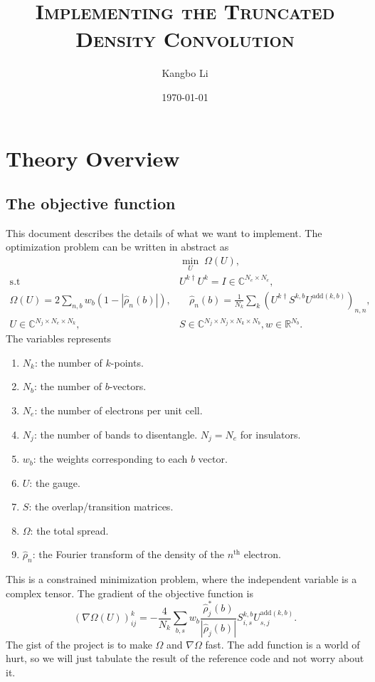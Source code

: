 \documentclass[a4paper, 12pt]{article}
\title{\scshape Implementing the Truncated Density Convolution}
\author{\normalsize Kangbo Li}
\date{\normalsize \today}
\begin{document}
\maketitle

\section{Theory Overview}%
\label{sec:Theory Overview}

\subsection{The objective function}%
\label{sub:The objective function}

This document describes the details of what we want to implement. 
The optimization problem can be written in abstract as 
\begin{align}
        &\min_{U}\;   \Omega(U),\\
        \mathrm{s.t}\; & U^{k \dagger} U^{k} = I \in \mathbb{C}^{N_e \times N_e},\\
        \Omega(U) = 2 \sum_{n, b} w_b (1 - |\hat{\rho}_n(b)|),& \quad \hat{\rho}_n(b) = \frac{1}{N_k}  \sum_k (U^{k \dagger} S^{k, b} U^{\mathrm{add}(k, b)})_{n,n},\\
        U \in \mathbb{C}^{N_j \times N_e \times N_k },& S \in \mathbb{C}^{N_j \times N_j \times N_k \times N_b }, 
        w \in \mathbb{R}^{N_b}\label{eq:dimensions}.
\end{align}
The variables represents 
\begin{enumerate}
    \item $N_k$: the number of $k$-points.
    \item $N_b$: the number of $b$-vectors. 
    \item $N_e$: the number of electrons per unit cell.
    \item $N_j$: the number of bands to disentangle. $N_j = N_e$ for insulators.
    \item $w_b$: the weights corresponding to each $b$ vector.
    \item $U$: the gauge.
    \item $S$: the overlap/transition matrices.
    \item $\Omega$: the total spread.
    \item $\hat{\rho}_n$: the Fourier transform of the density of the $n^{\mathrm{th}}$ electron.
\end{enumerate}

This is a constrained minimization problem, where the independent variable  is
a complex tensor. The gradient of the objective function is 
\begin{equation}
    (\nabla \Omega(U))^k_{ij} = - \frac{4}{N_k}  \sum_{b, s} w_b \frac{\hat{\rho}_j^*(b)}{|\hat{\rho}_j(b)|} S_{i, s}^{k, b} U_{s, j}^{\mathrm{add}(k, b)}.
\end{equation}
The gist of the project is to make $\Omega$ and $\nabla \Omega$ fast. The
$\mathrm{add}$ function is  a world of hurt, so we will just tabulate the
result of the reference code and not worry about it.
\end{document}
